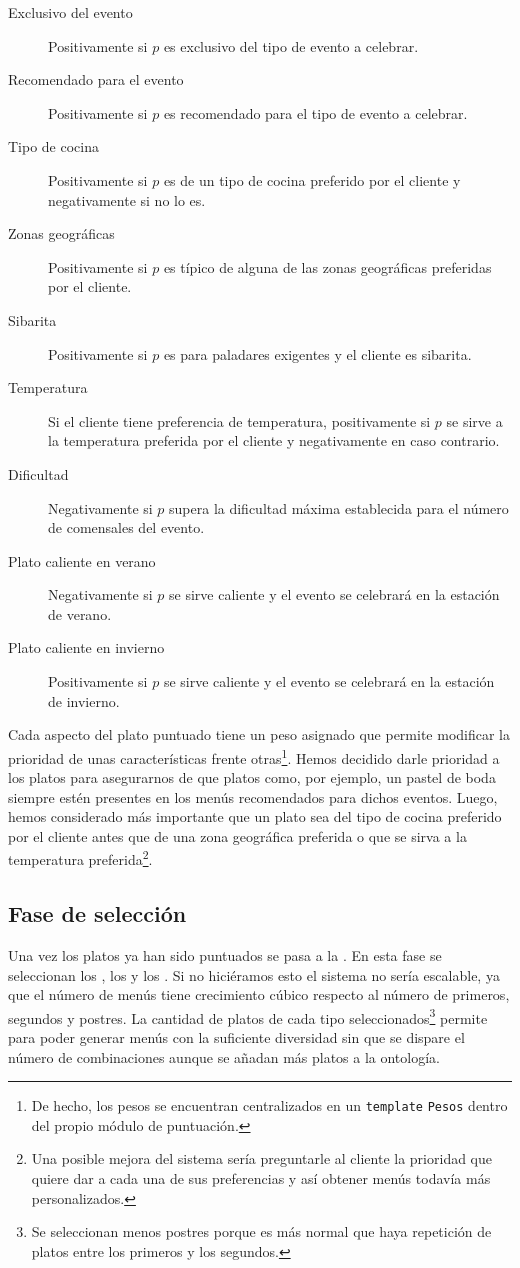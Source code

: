 \begin{description}
\item[Exclusivo del evento] Positivamente si $p$ es exclusivo del tipo de evento a celebrar.
\item[Recomendado para el evento] Positivamente si $p$ es recomendado para el tipo de evento a celebrar.
\item[Tipo de cocina] Positivamente si $p$ es de un tipo de cocina preferido por el cliente y negativamente si no lo es.
\item[Zonas geográficas] Positivamente si $p$ es típico de alguna de las zonas geográficas preferidas por el cliente.
\item[Sibarita] Positivamente si $p$ es para paladares exigentes y el cliente es sibarita.
\item[Temperatura] Si el cliente tiene preferencia de temperatura, positivamente si $p$ se sirve a la temperatura preferida por el cliente
y negativamente en caso contrario.
\item[Dificultad] Negativamente si $p$ supera la dificultad máxima establecida para el número de comensales del evento.
\item[Plato caliente en verano] Negativamente si $p$ se sirve caliente y el evento se celebrará en la estación de verano.
\item[Plato caliente en invierno] Positivamente si $p$ se sirve caliente y el evento se celebrará en la estación de invierno.
\end{description}

Cada aspecto del plato puntuado tiene un peso asignado que permite modificar la prioridad de unas características frente 
otras\footnote{De hecho, los pesos se encuentran centralizados en un \texttt{template} \texttt{Pesos} dentro del propio módulo de
puntuación.}. Hemos decidido darle prioridad a los platos  para asegurarnos de que platos como, por 
ejemplo, un pastel de boda siempre estén presentes en los menús recomendados para dichos eventos. Luego, hemos considerado más
importante que un plato sea del tipo de cocina preferido por el cliente antes que de una zona geográfica preferida o que se sirva a la
temperatura preferida\footnote{Una posible mejora del sistema sería preguntarle al cliente la prioridad que quiere dar a cada una de
sus preferencias y así obtener menús todavía más personalizados.}.

\subsection{Fase de selección}
Una vez los platos ya han sido puntuados se pasa a la . En esta fase se seleccionan los
, los  y los . Si no hiciéramos esto el
sistema no sería escalable, ya que el número de menús tiene crecimiento cúbico respecto al número de primeros, segundos y postres.
La cantidad de platos de cada tipo seleccionados\footnote{Se seleccionan menos postres porque es más normal que haya repetición de platos entre los primeros y los segundos.} permite para poder generar menús con la suficiente diversidad sin que se dispare
el número de combinaciones aunque se añadan más platos a la ontología.
